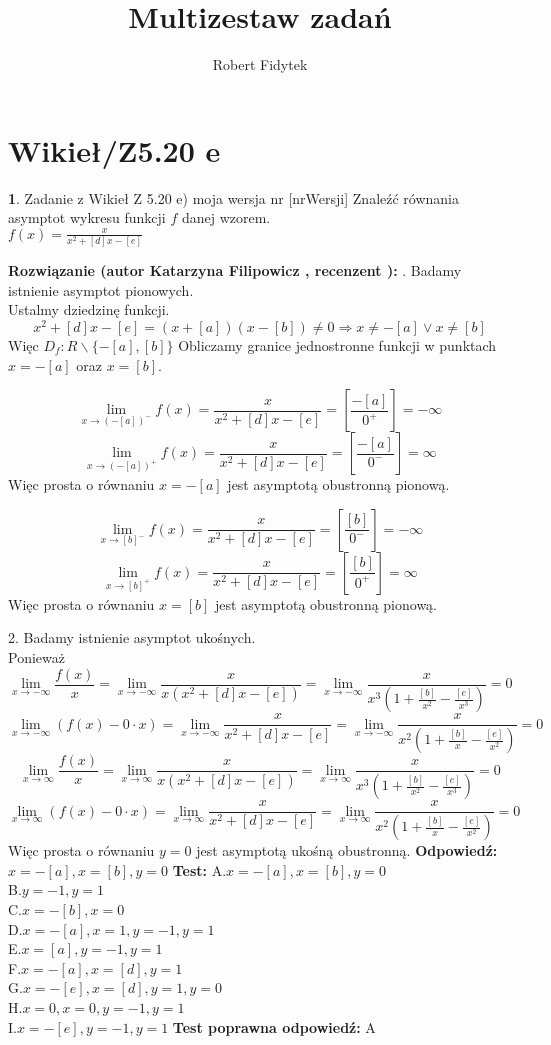 \documentclass[12pt, a4paper]{article}
\title{Multizestaw zadań}
\author{Robert Fidytek}
\date{}
\theoremstyle{definition} %
\newtheorem{zad}{}
\newcommand{\kategoria}[1]{\section{#1}} %
\newcommand{\zadStart}[1]{\begin{zad}#1\newline} %
\newcommand{\zadStop}{\end{zad}}   %
\newcommand{\rozwStart}[2]{\noindent \textbf{Rozwiązanie (autor #1 , recenzent #2): }\newline} %
\newcommand{\rozwStop}{\newline}                                            %
\newcommand{\odpStart}{\noindent \textbf{Odpowiedź:}\newline}    %
\newcommand{\odpStop}{\newline}                                             %
\newcommand{\testStart}{\noindent \textbf{Test:}\newline} %
\newcommand{\testStop}{\newline} %
\newcommand{\kluczStart}{\noindent \textbf{Test poprawna odpowiedź:}\newline} %
\newcommand{\kluczStop}{\newline} %
\begin{document}
\maketitle


\kategoria{Wikieł/Z5.20 e}
\zadStart{Zadanie z Wikieł Z 5.20 e) moja wersja nr [nrWersji]}
Znaleźć równania asymptot wykresu funkcji $f$ danej wzorem.\\
 $f(x)=\frac{x}{x^2+[d]x-[e]}$
\zadStop
\rozwStart{Katarzyna Filipowicz}{}
1. Badamy istnienie asymptot pionowych.\\

Ustalmy dziedzinę funkcji.\\
$$
x^2+[d]x-[e] =(x+[a])(x-[b])\neq 0\Rightarrow  x\neq-[a] \vee x\neq[b]
$$
Więc $D_f:R\backslash \{-[a],[b]\}$
Obliczamy granice jednostronne funkcji w punktach $x=-[a]$ oraz $x=[b]$.



$$
\lim_{x\rightarrow (-[a])^{-}}f(x)=\frac{x}{x^2+[d]x-[e]}
=\left[\frac{-[a]}{0^{+}}\right]=-\infty
$$ $$
\lim_{x\rightarrow (-[a])^{+}}f(x)=\frac{x}{x^2+[d]x-[e]}
=\left[\frac{-[a]}{0^{-}}\right]=\infty
$$
Więc prosta o równaniu $x=-[a]$ jest asymptotą obustronną pionową.


$$
\lim_{x\rightarrow [b]^{-}}f(x)=\frac{x}{x^2+[d]x-[e]}
=\left[\frac{[b]}{0^{-}}\right]=-\infty
$$ $$
\lim_{x\rightarrow [b]^{+}}f(x)=\frac{x}{x^2+[d]x-[e]}
=\left[\frac{[b]}{0^{+}}\right]=\infty
$$
Więc prosta o równaniu $x=[b]$ jest asymptotą obustronną pionową.


2. Badamy istnienie asymptot ukośnych.\\
Ponieważ
$$ 
\lim_{x\rightarrow-\infty} \frac{f(x)}{x}
=\lim_{x\rightarrow-\infty}\frac{x}{x(x^2+[d]x-[e])}
=\lim_{x\rightarrow-\infty}\frac{x}{x^3(1+\frac{[b]}{x^2}-\frac{[e]}{x^3})}=0
$$ $$
\lim_{x\rightarrow-\infty}(f(x)-0\cdot x)
=\lim_{x\rightarrow-\infty}\frac{x}{x^2+[d]x-[e]}
=\lim_{x\rightarrow-\infty} \frac{x}{x^2(1+\frac{[b]}{x}-\frac{[e]}{x^2})}=0
$$
$$ 
\lim_{x\rightarrow\infty} \frac{f(x)}{x}
=\lim_{x\rightarrow\infty}\frac{x}{x(x^2+[d]x-[e])}
=\lim_{x\rightarrow\infty}\frac{x}{x^3(1+\frac{[b]}{x^2}-\frac{[e]}{x^3})}=0
$$ $$
\lim_{x\rightarrow\infty}(f(x)-0\cdot x)
=\lim_{x\rightarrow\infty}\frac{x}{x^2+[d]x-[e]}
=\lim_{x\rightarrow\infty} \frac{x}{x^2(1+\frac{[b]}{x}-\frac{[e]}{x^2})}=0
$$
Więc prosta o równaniu $y=0$ jest asymptotą ukośną obustronną.
\rozwStop
\odpStart
$x=-[a],x=[b],y=0$
\odpStop
\testStart
A.$x=-[a],x=[b],y=0$\\
B.$y=-1,y=1$\\
C.$x=-[b],x=0$\\
D.$x=-[a],x=1,y=-1,y=1$\\
E.$x=[a],y=-1,y=1$\\
F.$x=-[a],x=[d],y=1$\\
G.$x=-[e],x=[d],y=1,y=0$\\
H.$x=0,x=0,y=-1,y=1$\\
I.$x=-[e],y=-1,y=1$
\testStop
\kluczStart
A
\kluczStop
\end{document}

